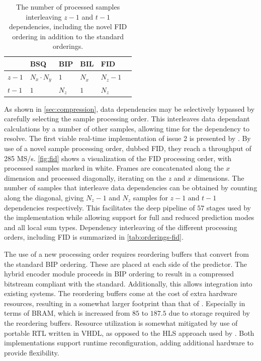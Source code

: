 \begin{table}[ht]
	\caption{The number of processed samples interleaving $z-1$ and $t-1$ dependencies, including the novel FID ordering in addition to the standard orderings.}
	\label{tab:orderings-fid}
	\begin{center}
		\begin{tabular}{l l l l l l}
			\hline
			      & \textbf{BSQ}    & \textbf{BIP} & \textbf{BIL} & \textbf{FID} \\
			\hline
			$z-1$ & $N_x \cdot N_y$ & $1$          & $N_x$        & $N_z - 1$    \\
			$t-1$ & $1$             & $N_z$        & $1$          & $N_z$        \\
			\hline
		\end{tabular}
	\end{center}
\end{table}

As shown in \autoref{sec:compression}, data dependencies may be selectively bypassed by carefully selecting the sample processing order. This interleaves data dependant calculations by a number of other samples, allowing time for the dependency to resolve. The first viable real-time implementation of issue 2 is presented by \citeauthor{basconesRealTimeFPGAImplementation2022}. By use of a novel sample processing order, dubbed \acrfull{FID}, they reach a throughput of 285 MS/s. \autoref{fig:fid} shows a visualization of the \acrshort{FID} processing order, with processed samples marked in white. Frames are concatenated along the $x$ dimension and processed diagonally, iterating on the $z$ and $x$ dimensions. The number of samples that interleave data dependencies can be obtained by counting along the diagonal, giving $N_z-1$ and $N_z$ samples for $z-1$ and $t-1$ dependencies respectively. This facilitates the deep pipeline of $57$ stages used by the implementation while allowing support for full and reduced prediction modes and all local sum types. Dependency interleaving of the different processing orders, including \acrshort{FID} is summarized in \autoref{tab:orderings-fid}.

The use of a new processing order requires reordering buffers that convert from the standard \acrshort{BIP} ordering. These are placed at each side of the predictor. The hybrid encoder module proceeds in \acrshort{BIP} ordering to result in a compressed bitstream compliant with the standard. Additionally, this allows integration into existing systems. The reordering buffers come at the cost of extra hardware resources, resulting in a somewhat larger footprint than that of \citeauthor{barriosHardwareImplementationCCSDS2021}. Especially in terms of \acrshort{BRAM}, which is increased from $85$ to $187.5$ due to storage required by the reordering buffers. Resource utilization is somewhat mitigated by use of portable \acrshort{RTL} written in VHDL, as opposed to the \acrshort{HLS} approach used by \citeauthor{barriosHardwareImplementationCCSDS2021}. Both implementations support runtime reconfiguration, adding additional hardware to provide flexibility.

